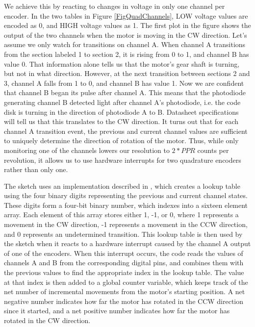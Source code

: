 We achieve this by reacting to changes in voltage in only one channel per encoder. In the two tables in Figure \ref{FigQuadChannels}, LOW voltage values are encoded as 0, and HIGH voltage values as 1. The first plot in the figure shows the output of the two channels when the motor is moving in the CW direction. Let's assume we only watch for transitions on channel A. When channel A transitions from the section labeled 1 to section 2, it is rising from 0 to 1, and channel B has value 0. That information alone tells us that the motor's gear shaft is turning, but not in what direction. However, at the next transition between sections 2 and 3, channel A falls from 1 to 0, and channel B has value 1. Now we are confident that channel B began its pulse after channel A. This means that the photodiode generating channel B detected light after channel A's photodiode, i.e. the code disk is turning in the direction of photodiode A to B. Datasheet specifications will tell us that this translates to the CW direction. It turns out that for each channel A transition event, the previous and current channel values are sufficient to uniquely determine the direction of rotation of the motor. Thus, while only monitoring one of the channels lowers our resolution to \(2 * PPR\) counts per revolution, it allows us to use hardware interrupts for two quadrature encoders rather than only one. \cite{encoderBlog}

The sketch uses an implementation described in \cite{encoderBlog}, which creates a lookup table using the four binary digits representing the previous and current channel states. These digits form a four-bit binary number, which indexes into a sixteen element array. Each element of this array stores either 1, -1, or 0, where 1 represents a movement in the CW direction, -1 represents a movement in the CCW direction, and 0 represents an undetermined transition. This lookup table is then used by the sketch when it reacts to a hardware interrupt caused by the channel A output of one of the encoders. When this interrupt occurs, the code reads the values of channels A and B from the corresponding digital pins, and combines them with the previous values to find the appropriate index in the lookup table. The value at that index is then added to a global counter variable, which keeps track of the net number of incremental movements from the motor's starting position. A net negative number indicates how far the motor has rotated in the CCW direction since it started, and a net positive number indicates how far the motor has rotated in the CW direction. \cite{encoderBlog}

